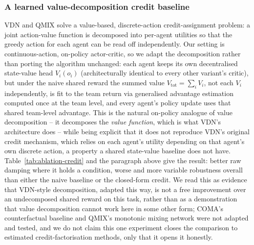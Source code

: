 \documentclass[preprint,11pt,authoryear]{elsarticle}
\begin{document}
\begin{table}[t]
\centering
\caption{Credit-assignment ablation at $\sigma=0.05$, six seeds per variant,
five variants: the closed-form credit, log-energy shaping, their combination,
a naive undecomposed shared reward, and a learned value-decomposition credit
(Section~\ref{sec:vdn}). All ten pairwise $p$-values are Holm-Bonferroni
corrected across this family.}
\label{tab:ablation-credit}
\small

\end{table}

\subsubsection{A learned value-decomposition credit baseline}
\label{sec:vdn}

VDN \citep{sunehag2018vdn} and QMIX \citep{rashid2018qmix} solve a
value-based, discrete-action credit-assignment problem: a joint action-value
function is decomposed into per-agent utilities so that the greedy action for
each agent can be read off independently. Our setting is continuous-action,
on-policy actor-critic, so we adapt the decomposition rather than porting the
algorithm unchanged: each agent keeps its own decentralised state-value head
$V_i(o_i)$ (architecturally identical to every other variant's critic), but
under the naive shared reward the summed value $V_{\mathrm{tot}}=\sum_i V_i$,
not each $V_i$ independently, is fit to the team return via generalised
advantage estimation \citep{schulman2016gae} computed once at the team level,
and every agent's policy update uses that shared team-level advantage. This
is the natural on-policy analogue of value decomposition -- it decomposes the
\emph{value function}, which is what VDN's architecture does -- while being
explicit that it does not reproduce VDN's original credit mechanism, which
relies on each agent's utility depending on that agent's own discrete action,
a property a shared state-value baseline does not have. Table~\ref{tab:ablation-credit}
and the paragraph above give the result: better raw damping where it holds a
condition, worse and more variable robustness overall than either the naive
baseline or the closed-form credit. We read this as evidence that VDN-style
decomposition, adapted this way, is not a free improvement over an undecomposed
shared reward on this task, rather than as a demonstration that value
decomposition cannot work here in some other form; COMA's counterfactual
baseline \citep{foerster2018coma} and QMIX's monotonic mixing network
\citep{rashid2018qmix} were not adapted and tested, and we do not claim this
one experiment closes the comparison to estimated credit-factorisation
methods, only that it opens it honestly.
\end{document}
